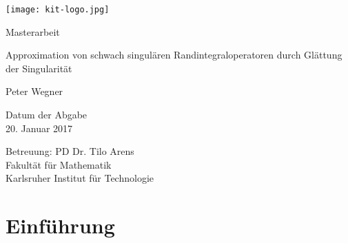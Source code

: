 \documentclass[12pt,a4paper]{scrartcl}
\numberwithin{equation}{section}
\begin{document}
  \pagestyle{empty}

  \begin{titlepage}

    \texttt{[image: kit-logo.jpg]} 
    \vspace*{2cm} 

 \begin{center} \large 
    
    Masterarbeit
    \vspace*{2cm}

    {\huge Approximation von schwach singulären
Randintegraloperatoren durch Glättung der Singularität}
    \vspace*{2.5cm}

    Peter Wegner
    \vspace*{1.5cm}

    Datum der Abgabe \\
    20. Januar 2017
    \vspace*{3.5cm}


    Betreuung: PD Dr. Tilo Arens \\[1cm]
    Fakultät für Mathematik \\[1cm]
		Karlsruher Institut für Technologie
  \end{center}
\end{titlepage}
\vspace*{1cm}
\newpage


  \tableofcontents
\newpage

 


  \pagestyle{headings}
\section{Einführung}
\end{document}
